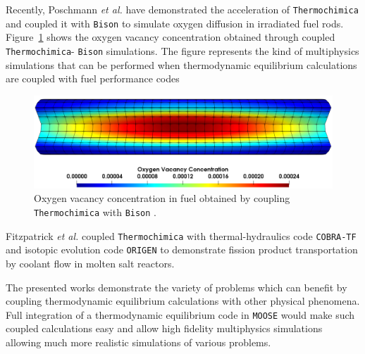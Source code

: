	Recently, Poschmann \textit{et al.} \cite{Poschmann:2019aa} have demonstrated the acceleration of \texttt{Thermochimica} and coupled it with \texttt{Bison} to simulate oxygen diffusion in irradiated fuel rods. Figure~\ref{fig:ovac} shows the oxygen vacancy concentration obtained through coupled \texttt{Thermochimica}- \texttt{Bison} simulations. The figure represents the kind of multiphysics simulations that can be performed when thermodynamic equilibrium calculations are coupled with fuel performance  codes
	\begin{figure}[htbp]
		\begin{center}
		\includegraphics[width=\textwidth]{figures/O_M}
		\caption{Oxygen vacancy concentration in  fuel obtained by coupling \texttt{Thermochimica} with \texttt{Bison}  \cite{Poschmann:2019aa}.}
		\label{fig:ovac}
		\end{center}
	\end{figure}
	
	Fitzpatrick \textit{et al.} \cite{Fitzpatrick18} coupled \texttt{Thermochimica} with thermal-hydraulics code \texttt{COBRA-TF} and isotopic evolution code \texttt{ORIGEN} to demonstrate fission product transportation by coolant flow in molten salt reactors. 
	
	The presented works demonstrate the variety of problems which can benefit by coupling thermodynamic equilibrium calculations with other physical phenomena. Full integration of a thermodynamic equilibrium code in \texttt{MOOSE} would make such coupled calculations easy and allow high fidelity multiphysics simulations allowing much more realistic simulations of various problems.

